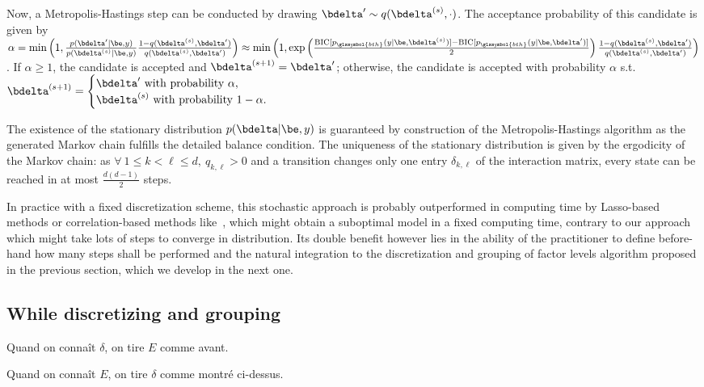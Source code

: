 Now, a Metropolis-Hastings step can be conducted by drawing $\bdelta' \sim q(\bdelta^{(s)},\cdot)$. The acceptance probability of this candidate is given by $\alpha = \min \left( 1, \frac{p(\bdelta' | \be,y)}{p(\bdelta^{(s)} | \be, y)} \frac{1-q(\bdelta^{(s)},\bdelta')}{q(\bdelta^{(s)},\bdelta')} \right) \approx \min \left( 1, \exp \left( \frac{\text{BIC}[p_{\glssymbol{bth}}(y | \be, \bdelta^{(s)})] - \text{BIC}[p_{\glssymbol{bth}}(y | \be, \bdelta')]}{2} \right) \frac{1-q(\bdelta^{(s)},\bdelta')}{q(\bdelta^{(s)},\bdelta')} \right)$. If $\alpha \geq 1$, the candidate is accepted and $\bdelta^{(s+1)} = \bdelta'$; otherwise, the candidate is accepted with probability $\alpha$ s.t.\ $\bdelta^{(s+1)} = \begin{cases} \bdelta' \text{ with probability } \alpha, \\ \bdelta^{(s)} \text{ with probability } 1-\alpha. \end{cases}$

The existence of the stationary distribution $p(\bdelta | \be,y)$ is guaranteed by construction of the Metropolis-Hastings algorithm as the generated Markov chain fulfills the detailed balance condition. The uniqueness of the stationary distribution is given by the ergodicity of the Markov chain: as $\forall \: 1 \leq  k < \ell \leq d, \: q_{k,\ell} > 0$ and a transition changes only one entry $\delta_{k,\ell}$ of the interaction matrix, every state can be reached in at most $\frac{d(d-1)}{2}$ steps.

In practice with a fixed discretization scheme, this stochastic approach is probably outperformed in computing time by Lasso-based methods or correlation-based methods like~\cite{simon}, which might obtain a suboptimal model in a fixed computing time, contrary to our approach which might take lots of steps to converge in distribution. Its double benefit however lies in the ability of the practitioner to define before-hand how many steps shall be performed and the natural integration to the discretization and grouping of factor levels algorithm proposed in the previous section, which we develop in the next one.

\subsection{While discretizing and grouping}

Quand on connaît $\delta$, on tire $E$ comme avant.

Quand on connaît $E$, on tire $\delta$ comme montré ci-dessus.

